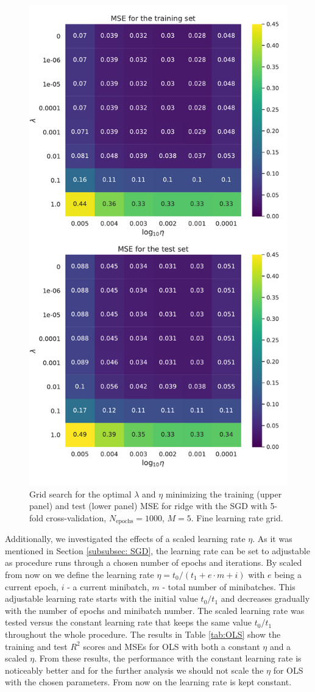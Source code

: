 \documentclass{emulateapj}
\begin{document}
\begin{figure}[!htb]
    \centering
    \includegraphics[width=.49\textwidth]{Figures/ridge_MSE_fine.pdf}
    \caption{Grid search for the optimal $\lambda$ and $\eta$ minimizing the training (upper panel) and test (lower panel) MSE for ridge with the SGD with 5-fold cross-validation, $N_{\mathrm{epochs}}=1000$, $M=5$. Fine learning rate grid.}
    \label{fig: ridge_grid_MSE_fine}
\end{figure}

Additionally, we investigated the effects of a scaled learning rate $\eta$. As it was mentioned in Section \ref{subsubsec: SGD}, the learning rate can be set to adjustable as procedure runs through a chosen number of epochs and iterations. By scaled from now on we define the learning rate $\eta=t_0/(t_1+e\cdot m+i)$ with $e$ being a current epoch, $i$ - a current minibatch, $m$ - total number of minibatches. This adjustable learning rate starts with the initial value $t_0/t_1$ and decreases gradually with the number of epochs and minibatch number. The scaled learning rate was tested versus the constant learning rate that keeps the same value $t_0/t_1$ throughout the whole procedure. The results in Table \ref{tab:OLS} show the training and test $R^{2}$ scores and MSEs for OLS with both a constant $\eta$ and a scaled $\eta$. From these results, the performance with the constant learning rate is noticeably better and for the further analysis we should not scale the $\eta$ for OLS with the chosen parameters. From now on the learning rate is kept constant.
\end{document}
